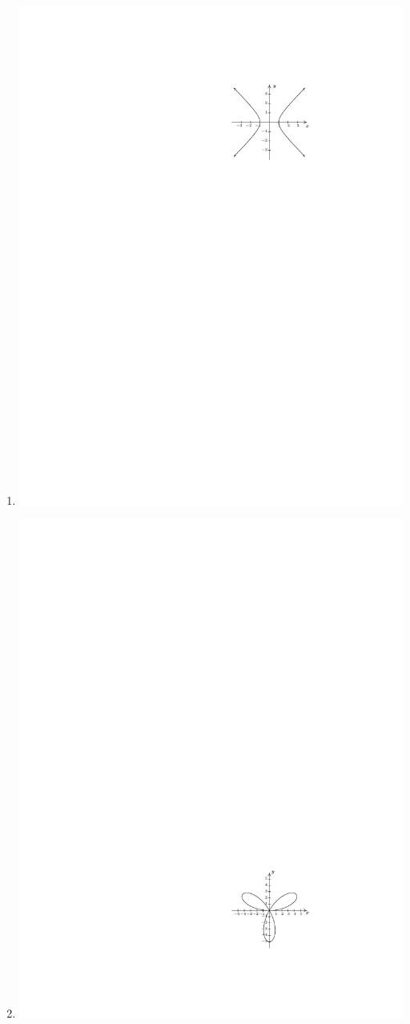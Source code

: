 \documentclass{ximera}
\begin{document}
\begin{exercise}
\begin{enumerate}
\item{\includegraphics{WiaFgraphs1-4.pdf}}
\item{\includegraphics{WiaFgraphs1-6.pdf}}

\end{enumerate}
\end{exercise}
\end{document}
